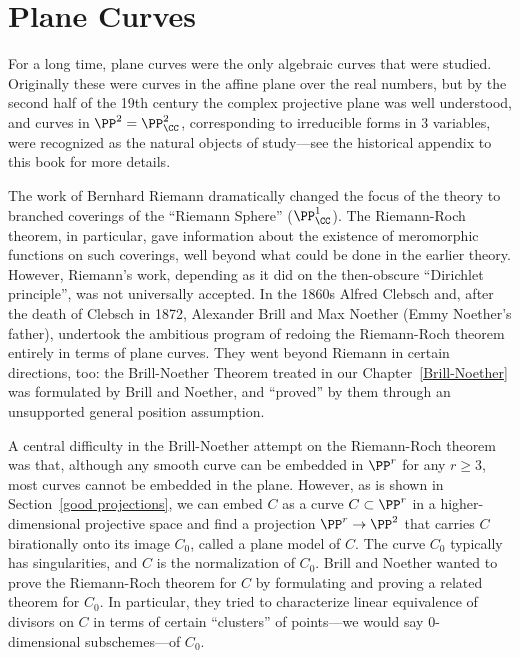

\def\adj{{\rm adj}}
\chapter{Plane Curves}
\label{PlaneCurvesChapter}


For a long time, plane curves were the only algebraic curves that were studied. Originally these were curves in the affine plane over the real numbers, but by the second half of the 19th century the complex projective plane was well understood, and curves in $\PP^2 = \PP^2_\CC$, corresponding to irreducible forms in 3 variables, were recognized as the natural objects of study---see the historical appendix to this book for more details.

The work of Bernhard Riemann dramatically changed the focus of the theory to branched coverings of   the ``Riemann Sphere'' ($\PP^1_\CC$). The Riemann-Roch theorem, in particular, gave information about the existence of meromorphic functions on such coverings, well beyond what could be done in the earlier theory. However, Riemann's work, depending as it did on the then-obscure ``Dirichlet principle'', was not universally accepted. In the 1860s Alfred Clebsch and, after the death of Clebsch  in 1872, Alexander Brill and Max Noether (Emmy Noether's father), undertook the ambitious program of redoing the Riemann-Roch theorem entirely in terms of plane curves. They went beyond Riemann in certain directions, too: the Brill-Noether Theorem treated in our Chapter~\ref{Brill-Noether} was formulated by Brill and Noether, and ``proved'' by them through an unsupported general position assumption. 


A central difficulty in the Brill-Noether attempt on the Riemann-Roch theorem was that,
although any smooth curve can be embedded in $\PP^r$ for any $r \geq 3$, most curves cannot be embedded in the plane. 
However, as is shown in Section~\ref{good projections}, we can embed $C$ as a curve $ C \subset \PP^r$ in a higher-dimensional projective space and find a projection $\PP^r \to \PP^2$ that carries $C$ birationally onto its image $C_0$, called a plane model of $C$. The curve $C_0$ typically has singularities, and $C$ is the normalization of $C_0$. Brill and Noether wanted to prove the Riemann-Roch theorem for $C$ by formulating and proving a related theorem for $C_0$. In particular, they tried to characterize linear equivalence of divisors on $C$ in terms of certain ``clusters'' of points---we would say 0-dimensional subschemes---of $C_0$. 


